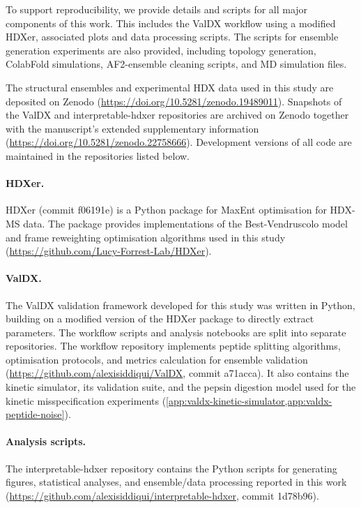 To support reproducibility, we provide details and scripts for all major components of this work. This includes the ValDX workflow using a modified HDXer, associated plots and data processing scripts. The scripts for ensemble generation experiments are also provided, including topology generation, ColabFold simulations, AF2-ensemble cleaning scripts, and MD simulation files.

The structural ensembles and experimental HDX data used in this study are deposited on Zenodo (\url{https://doi.org/10.5281/zenodo.19489011}). Snapshots of the ValDX and interpretable-hdxer repositories are archived on Zenodo together with the manuscript's extended supplementary information (\url{https://doi.org/10.5281/zenodo.22758666}). Development versions of all code are maintained in the repositories listed below.

\paragraph{HDXer.}
HDXer (commit f06191e) is a Python package for MaxEnt optimisation for HDX-MS data. The package provides implementations of the Best-Vendruscolo model and frame reweighting optimisation algorithms used in this study (\url{https://github.com/Lucy-Forrest-Lab/HDXer}).

\paragraph{ValDX.}
The ValDX validation framework developed for this study was written in Python, building on a modified version of the HDXer package to directly extract parameters. The workflow scripts and analysis notebooks are split into separate repositories. The workflow repository implements peptide splitting algorithms, optimisation protocols, and metrics calculation for ensemble validation (\url{https://github.com/alexisiddiqui/ValDX}, commit a71acca). It also contains the kinetic simulator, its validation suite, and the pepsin digestion model used for the kinetic misspecification experiments (\cref{app:valdx-kinetic-simulator,app:valdx-peptide-noise}).

\paragraph{Analysis scripts.}
The interpretable-hdxer repository contains the Python scripts for generating figures, statistical analyses, and ensemble/data processing reported in this work (\url{https://github.com/alexisiddiqui/interpretable-hdxer}, commit 1d78b96).

